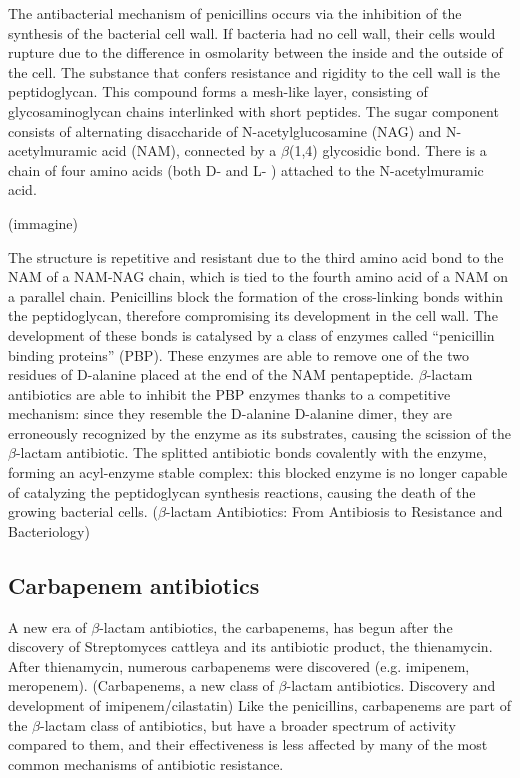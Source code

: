 \documentclass[11pt]{report}
\begin{document}
The antibacterial mechanism of penicillins occurs via the inhibition of the synthesis of the bacterial cell wall. If bacteria had no cell wall, their cells would rupture due to the difference in osmolarity between the inside and the outside of the cell.
The substance that confers resistance and rigidity to the cell wall is the peptidoglycan. This compound forms a mesh-like layer, consisting of glycosaminoglycan chains interlinked with short peptides. The sugar component consists of alternating disaccharide of N-acetylglucosamine (NAG) and N-acetylmuramic acid (NAM), connected by a $\beta$(1,4) glycosidic bond. There is a chain of four amino acids (both D- and L- ) attached to the N-acetylmuramic acid.

(immagine)

The structure is repetitive and resistant due to the third amino acid bond to the NAM of a NAM-NAG chain, which is tied to the fourth amino acid of a NAM on a parallel chain.
Penicillins block the formation of the cross-linking bonds within the peptidoglycan, therefore compromising its development in the cell wall. The development of these bonds is catalysed by a class of enzymes called “penicillin binding proteins” (PBP). These enzymes are able to remove one of the two residues of D-alanine placed at the end of the NAM pentapeptide.
$\beta$-lactam antibiotics are able to inhibit the PBP enzymes thanks to a competitive mechanism: since they resemble the D-alanine D-alanine dimer, they are erroneously recognized by the enzyme as its substrates, causing the scission of the $\beta$-lactam antibiotic. The splitted antibiotic bonds covalently with the enzyme, forming an acyl-enzyme stable complex: this blocked enzyme is no longer capable of catalyzing the peptidoglycan synthesis reactions, causing the death of the growing bacterial cells.
($\beta$-lactam Antibiotics: From Antibiosis to Resistance and Bacteriology)


\subsection{Carbapenem antibiotics}
A new era of $\beta$-lactam antibiotics, the carbapenems, has begun after the discovery of Streptomyces cattleya and its antibiotic product, the thienamycin.
After thienamycin, numerous carbapenems were discovered (e.g. imipenem, meropenem).
(Carbapenems, a new class of $\beta$-lactam antibiotics. Discovery and development of imipenem/cilastatin)
Like the penicillins, carbapenems are part of the $\beta$-lactam class of antibiotics, but have a broader spectrum of activity compared to them, and their effectiveness is less affected by many of the most common mechanisms of antibiotic resistance.
\end{document}
